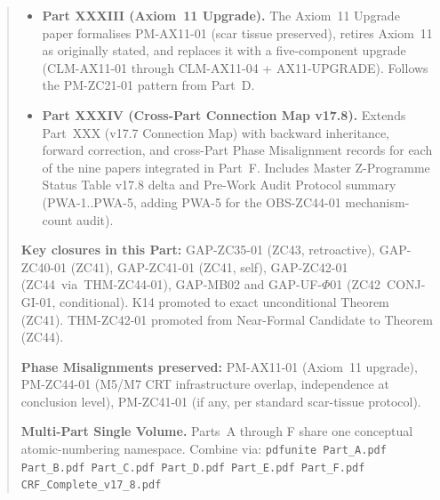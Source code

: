 \documentclass[12pt, a4paper]{article}
\begin{document}
\begin{abstract}
\begin{itemize}[leftmargin=2em]
\item \textbf{Part XXXIII (Axiom~11 Upgrade).}
The Axiom~11 Upgrade paper formalises PM-AX11-01 (scar tissue
preserved), retires Axiom~11 as originally stated, and replaces it
with a five-component upgrade (CLM-AX11-01 through CLM-AX11-04 +
AX11-UPGRADE). Follows the PM-ZC21-01 pattern from Part~D.

\item \textbf{Part XXXIV (Cross-Part Connection Map v17.8).}
Extends Part~XXX (v17.7 Connection Map) with backward inheritance,
forward correction, and cross-Part Phase Misalignment records for
each of the nine papers integrated in Part~F.
Includes Master Z-Programme Status Table v17.8 delta and
Pre-Work Audit Protocol summary (PWA-1..PWA-5, adding PWA-5
for the OBS-ZC44-01 mechanism-count audit).
\end{itemize}

\textbf{Key closures in this Part:}
GAP-ZC35-01 (ZC43, retroactive),
GAP-ZC40-01 (ZC41),
GAP-ZC41-01 (ZC41, self),
GAP-ZC42-01 (ZC44~via~THM-ZC44-01),
GAP-MB02 and GAP-UF-$\Phi$01 (ZC42~CONJ-GI-01, conditional).
K14 promoted to exact unconditional Theorem (ZC41).
THM-ZC42-01 promoted from Near-Formal Candidate to Theorem (ZC44).

\textbf{Phase Misalignments preserved:}
PM-AX11-01 (Axiom~11 upgrade),
PM-ZC44-01 (M5/M7 CRT infrastructure overlap, independence at
conclusion level),
PM-ZC41-01 (if any, per standard scar-tissue protocol).

\textbf{Multi-Part Single Volume.}
Parts~A through F share one conceptual atomic-numbering namespace.
Combine via:
\texttt{pdfunite Part\_A.pdf Part\_B.pdf Part\_C.pdf Part\_D.pdf
Part\_E.pdf Part\_F.pdf CRF\_Complete\_v17\_8.pdf}
\end{abstract}

\tableofcontents
\newpage
\end{document}
